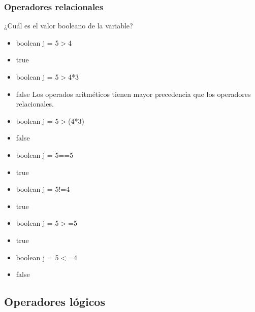 \documentclass{beamer}
\begin{document}
\begin{frame}
    \frametitle{Operadores relacionales}
¿Cuál es el valor booleano de la variable?
\begin{itemize}[<+->]

      \item boolean j = 5$>$4
      \item \alert{true} 
      \item boolean j = 5$>$4*3
      \item \alert{false} Los operados aritméticos tienen mayor precedencia que los operadores relacionales.
      \item boolean j = 5$>$(4*3)
      \item \alert{false}
      \item boolean j = 5==5
      \item \alert{true}
      \item boolean j = 5!=4
      \item \alert{true}\\
	  \item boolean j = 5$>$=5
      \item \alert{true}\\
	  \item boolean j = 5$<$=4
      \item \alert{false}
      
      \end{itemize}
      \pause
\end{frame}

\subsection{Operadores lógicos}
\end{document}

